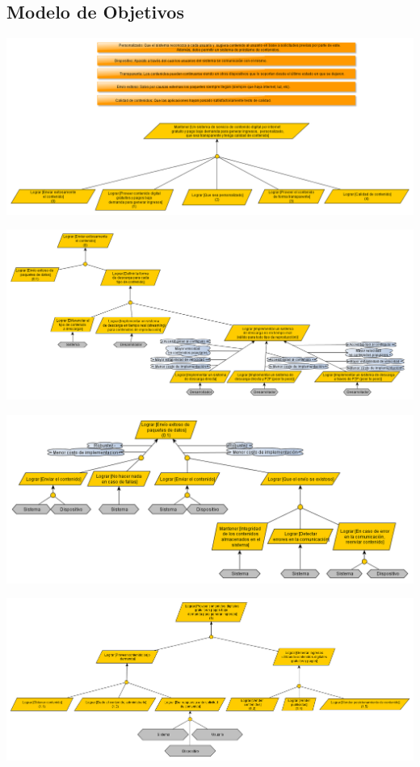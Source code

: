 \documentclass[11pt, a4paper, spanish]{article}
\begin{document}
\subsection{Modelo de Objetivos}

	\begin{center}
		\includegraphics[scale=0.35]{Diagramas/ModelodeObjetivosPrincipal.png}
	\end{center}
\newpage
	\begin{center}
		\includegraphics[scale=0.50, angle=90]{Diagramas/0ModelodeObjetivosLograrenviarcontenido.png}
	\end{center}
\newpage
	\begin{center}
		\includegraphics[scale=0.65, angle=90]{Diagramas/0-1ModelodeObjetivosEnvioexitoso.png}
	\end{center}
\newpage
	\begin{center}
		\includegraphics[scale=0.50, angle=90]{Diagramas/1ModelodeObjetivosGenerarIngresos.png}
	\end{center}
\end{document}
